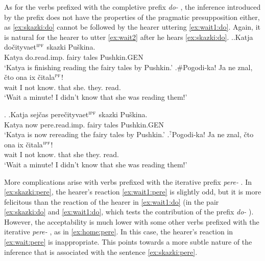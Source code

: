 As for the verbs prefixed with the completive  prefix \textit{do-}  , the inference introduced by the prefix does not have the properties of the pragmatic presupposition either, as \ref{ex:skazki:do} cannot be followed by the hearer uttering \ref{ex:wait1:do}. Again, it is natural for the hearer to utter \ref{ex:wait2} after he hears \ref{ex:skazki:do}.
\ex.\ag.\label{ex:skazki:do}Katja do\v{c}ityvaet$^{\textsc{ipf}}$ skazki Pu\v{s}kina.\\
Katya do.read.imp. {fairy tales} Pushkin.{\tiny GEN}\\
\trans `Katya is finishing reading the fairy tales by Pushkin.'
\bg.\#Pogodi-ka! Ja ne znal, \v{c}to ona ix \v{c}itala$^{\textsc{pf}}$!\label{ex:wait1:do}\\
wait I not know. that she. they. read.\\
\trans `Wait a minute! I didn't know that she was reading them!'

\ex. \label{ex:skazki:pere}\ag.\label{ex:skazki:pere1}Katja sej\v{c}as pere\v{c}ityvaet$^{\textsc{ipf}}$ skazki Pu\v{s}kina.\\
Katya now pere.read.imp. {fairy tales} Pushkin.{\tiny GEN}\\
\trans `Katya is now rereading the fairy tales by Pushkin.'
\bg.$^?$Pogodi-ka! Ja ne znal, \v{c}to ona ix \v{c}itala$^{\textsc{ipf}}$!\label{ex:wait1:pere}\\
wait I not know. that she they. read.\\
\trans `Wait a minute! I didn't know that she was reading them!'

More complications arise with verbs prefixed with the iterative prefix \textit{pere-}  . In \ref{ex:skazki:pere}, the hearer's reaction \ref{ex:wait1:pere} is slightly odd, but it is more felicitous than the reaction of the hearer in \ref{ex:wait1:do} (in the pair \ref{ex:skazki:do} and \ref{ex:wait1:do}, which tests the contribution of the prefix \textit{do-}  ). However, the acceptability is much lower with some other verbs prefixed with the iterative \textit{pere-}  , as in \ref{ex:home:pere}. In this case, the hearer's reaction in \ref{ex:wait:pere} is inappropriate. This points towards a more subtle nature of the inference that is associated with the sentence \ref{ex:skazki:pere}.

